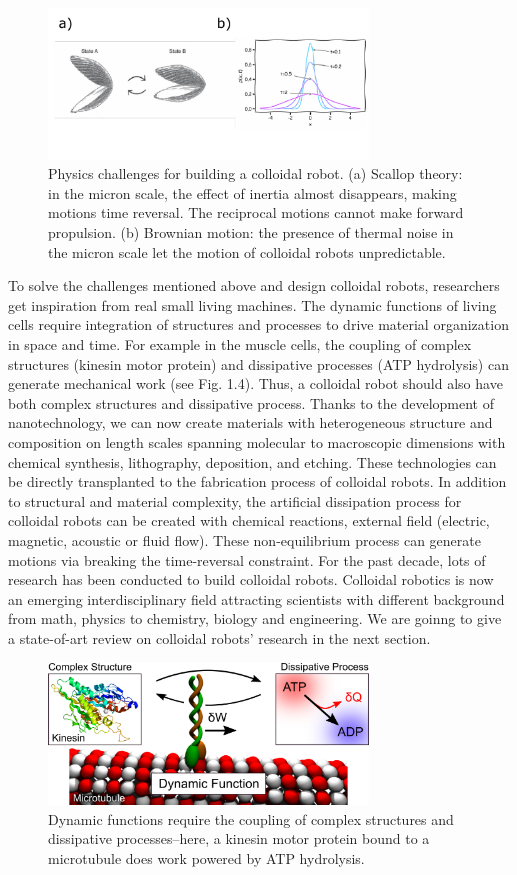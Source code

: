 \begin{figure}
\centering
\includegraphics[width=8.5cm]{figures/1_3.pdf}
\caption{Physics challenges for building a colloidal robot. (a) Scallop theory: in the micron scale, the effect of inertia almost disappears, making motions time reversal. The reciprocal motions cannot make forward propulsion.  (b) Brownian motion: the presence of thermal noise in the micron scale let the motion of colloidal robots unpredictable.}
\label{fig:1.3}
\end{figure}
To solve the  challenges mentioned above and design colloidal robots, researchers get inspiration from real small living  machines. The dynamic functions of living cells require integration of structures and processes to drive material organization in space and time. For example in the muscle cells,  the coupling of complex structures (kinesin motor protein) and dissipative processes (ATP hydrolysis) can generate mechanical work (see Fig. 1.4). Thus, a colloidal robot should also have both complex structures and dissipative process. Thanks to the development of nanotechnology, we can now create materials with heterogeneous structure and composition on length scales spanning molecular to macroscopic dimensions with chemical synthesis, lithography, deposition, and etching. These technologies can be directly transplanted to the fabrication process of colloidal robots. In addition to structural and material complexity, the artificial dissipation process for colloidal robots  can be created with chemical reactions, external field (electric, magnetic, acoustic or fluid flow). These non-equilibrium process can generate motions via breaking the time-reversal constraint. For the past decade, lots of research has been conducted to build colloidal robots. Colloidal robotics is now an emerging interdisciplinary field attracting scientists with different background from math, physics to chemistry, biology and engineering. We are goinng to give a state-of-art  review on colloidal robots' research in the next section.
\begin{figure}
\centering
\includegraphics[width=8.5cm]{figures/1_4.png}
\caption{Dynamic functions require the coupling of complex structures and dissipative processes–here, a kinesin motor protein bound to a microtubule  does work powered by ATP hydrolysis.}
\label{fig:1.4}
\end{figure}

